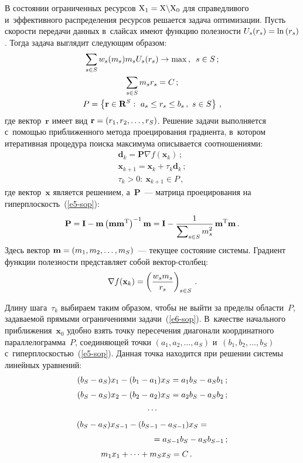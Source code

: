\begin{multicols}{2}
  В состоянии ограниченных ресурсов $\mathrm{X}_1\hm= 
\mathrm{X}\backslash \mathrm{X}_0$ для справедливого и~эффективного 
распределения ресурсов решается задача оптимизации. Пусть скорости 
передачи данных в~слайсах имеют функцию полезности $U_s(r_s)\hm= \ln \left( 
r_s\right)$. Тогда задача выглядит следующим образом:
  \begin{gather}
  \sum\limits_{s\in S} w_s(m_s) m_s U_s(r_s)\to \max\,,\enskip s\in S\,;\notag\\
  \sum\limits_{s\in S} m_s r_s=C\,;\label{e5-sop}\\
  P=\left\{ \mathbf{r}\in \mathbf{R}^S:\ a_s\leq r_s\leq b_s\,,\ s\in S\right\}\,,
  \label{e6-sop}
  \end{gather}
где вектор~$\mathbf{r}$ имеет вид $\mathbf{r}\hm= (r_1, r_2, \ldots , r_S)$. 
Решение задачи выполняется с~по\-мощью при\-бли\-жен\-но\-го метода 
проецирования градиента, в~котором итеративная процедура поиска максимума 
описывается соотношениями:
\begin{gather*}
\mathbf{d}_k=\mathbf{P}\nabla f(\mathbf{x}_k)\,;\\
\mathbf{x}_{k+1} =\mathbf{x}_k+\tau_k \mathbf{d}_k\,;\\
\tau_k>0:\ \mathbf{x}_{k+1}\in P\,,
\end{gather*}
где вектор~$\mathbf{x}$ является решением, а~$\mathbf{P}$~--- матрица 
проецирования на гиперплоскость~(\ref{e5-sop}):
$$
\mathbf{P}=\mathbf{I}-\mathbf{m}\left(\mathbf{m}
\mathbf{m}^{\mathrm{T}}\right)^{-1}\mathbf{m} = \mathbf{I} -\displaystyle\frac{\displaystyle 1\mathstrut}{\displaystyle \sum\nolimits_{s\in S} 
m_s^2\mathstrut}\,\mathbf{m}^{\mathrm{T}}\mathbf{m}\,.
$$
    Здесь вектор $\mathbf{m}\hm= (m_1, m_2, \ldots , m_S)$~--- текущее 
состояние системы. Градиент функции полезности представляет собой  
век\-тор-стол\-бец:
  $$
  \nabla f(\mathbf{x}_k)=\left( \displaystyle\frac{\displaystyle w_s m_s\mathstrut}{\displaystyle r_s\mathstrut}\right)_{s\in S}\,.
  $$
  
  Длину шага~$\tau_k$ выбираем таким образом, чтобы не выйти за пределы 
области~$P$, задаваемой прямыми ограничениями задачи~(\ref{e6-sop}). 
В~качестве начального приближения~$\mathbf{x}_0$ удобно взять точку 
пересечения диагонали координатного параллелограмма~$P$, соединяющей 
точки $(a_1, a_2, \ldots , a_S)$ и~$(b_1, b_2, \ldots , b_S)$ 
с~гиперплоскостью~(\ref{e5-sop}). Данная точка находится при решении 
системы линейных уравнений:
  \begin{equation*}
  \left.
  \begin{array}{c}
  (b_S-a_S)x_1-(b_1-a_1)x_S=a_1b_S-a_Sb_1\,;\\[6pt]
  (b_S-a_S)x_2-(b_2-a_2)x_S=a_2b_S-a_Sb_2\,;\\[6pt]
  \cdots\\[6pt]
  \hspace*{-8mm}(b_S-a_S)x_{S-1}-(b_{S-1}-a_{S-1})x_S={}\\[6pt]
  \hspace*{32mm}{}=a_{S-1}b_S - a_Sb_{S-1}\,;\\[6pt]
  \hspace*{-5mm}m_1x_1+\cdots + m_S x_S=C\,.
  \end{array}
  \right.
  \end{equation*}
  

\end{multicols}
